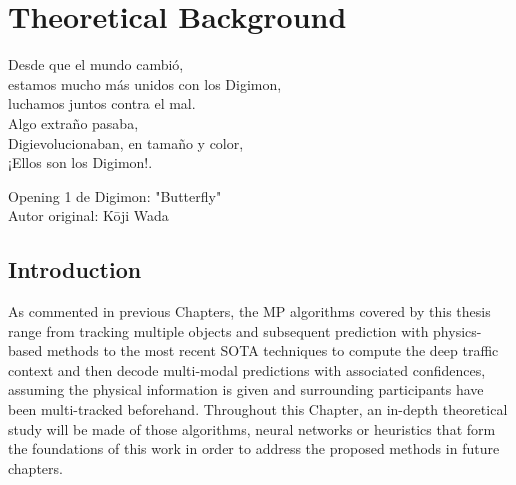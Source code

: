 % 
% 
% 
% 
% 
% 
% 

\chapter{Theoretical Background}
\label{cha:theoretical_background}

\begin{FraseCelebre}
	\begin{Frase}
		Desde que el mundo cambió, \\
		estamos mucho más unidos con los Digimon, \\
		luchamos juntos contra el mal. \\ 

		Algo extraño pasaba, \\
		Digievolucionaban, en tamaño y color, \\
		¡Ellos son los Digimon!. 
	\end{Frase}
	\begin{Fuente}
		Opening 1 de Digimon: "Butterfly" \\
		Autor original: Kōji Wada
	\end{Fuente}
\end{FraseCelebre}

\section{Introduction}
\label{sec:3_introduction}

As commented in previous Chapters, the \ac{MP} algorithms covered by this thesis range from tracking multiple objects and subsequent prediction with physics-based methods to the most recent \ac{SOTA} techniques to compute the deep traffic context and then decode multi-modal predictions with associated confidences, assuming the physical information is given and surrounding participants have been multi-tracked beforehand. Throughout this Chapter, an in-depth theoretical study will be made of those algorithms, neural networks or heuristics that form the foundations of this work in order to address the proposed methods in future chapters.

